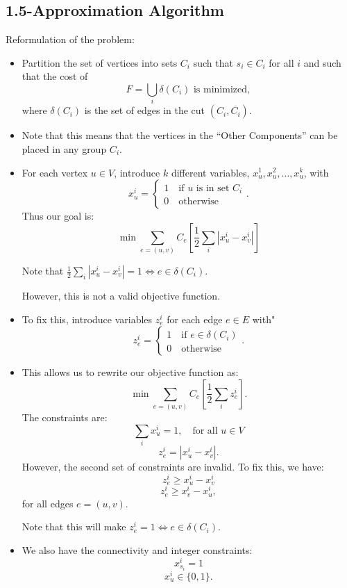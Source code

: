 \documentclass[../main/main.tex]{subfiles}
\begin{document}
\subsection{1.5-Approximation Algorithm}
Reformulation of the problem:
\begin{itemize}
	\item Partition the set of vertices into sets $C_i$ such that $s_i\in C_i$ for all $i$ and such that the cost of \[
			F=\bigcup\limits_{i} \delta(C_i) \text{ is minimized}
		,\] where $\delta(C_i)$ is the set of edges in the cut  $\left( C_i, \overline{C_i} \right) $.
	\item Note that this means that the vertices in the ``Other Components'' can be placed in any group $C_i$.
	\item For each vertex $u\in V$, introduce $k$ different variables, $x_u^{1}, x_u^{2}, \ldots, x_u^{k}$, with \[
	x_u^{i}=\begin{cases}
		1\quad \text{if $u$ is in set $C_i$} \\
			0\quad \text{otherwise}
	\end{cases}
	.\] Thus our goal is: \[
	\min \sum_{e=(u,v)} C_e\left[ \frac{1}{2}\sum_i \left| x_u^i - x_v^i \right|  \right] 
	\] 
	\begin{remark}
		Note that $\frac{1}{2}\sum_i \left| x_u^i - x_v^i \right|=1\iff e\in \delta(C_i)$.
	\end{remark}
	However, this is not a valid objective function. 
\item To fix this, introduce variables $z_e^i$ for each edge $e\in E$ with" \[
z_e^i=\begin{cases}
	1\quad \text{if $e\in \delta(C_i)$}\\
	0\quad \text{otherwise}
\end{cases}
.\]  \item This allows us to rewrite our objective function as: \[
\min \sum_{e=(u,v)} C_e\left[ \frac{1}{2}\sum_i z_e^i \right] 
.\] The constraints are: \[
\sum_i x_u^i = 1,\quad\text{for all $u\in V$}
\] \[
z_e^i=|x_u^i-x_v^i|
.\] However, the second set of constraints are invalid. To fix this, we have: \[
z_e^i \ge x_u^i-x_v^i
\] \[
z_e^i \ge x_v^i - x_u^i
,\]  for all edges $e=(u,v)$.
 \begin{remark}
	 Note that this will make $z_e^i=1\iff e\in \delta(C_i)$.  
\end{remark}
\item We also have the connectivity and integer constraints: \[
		x_{s_i}^i=1
\] \[
x_u^i \in \{0,1\} 
.\] 
\end{itemize}
\end{document}
